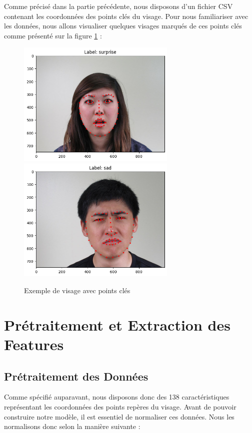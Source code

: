 \documentclass{rapport}
\begin{document}
Comme précisé dans la partie précédente, nous disposons d'un fichier CSV contenant les coordonnées des points clés du visage. Pour nous familiariser
avec les données, nous allons visualiser quelques visages marqués de ces points clés comme présenté sur la figure
\ref*{fig:face_landmarks} :
\begin{figure}
    \centering
    \includegraphics[height=6cm]{IMAGES/exemple1_landmark_jeu_donnee.png}
    \includegraphics[height=6cm]{IMAGES/exemple2_landmark_jeu_donnee.png}
    \caption{Exemple de visage avec points clés}
    \label{fig:face_landmarks}
\end{figure}

\section{Prétraitement et Extraction des Features}
\subsection{Prétraitement des Données}
Comme spécifié auparavant, nous disposons donc des 138 caractéristiques représentant les coordonnées des points repères du visage.
Avant de pouvoir construire notre modèle, il est essentiel de normaliser ces données.
Nous les normalisons donc selon la manière suivante \cite{kalapalaFacialExpressionRecognition2020} :\\
\end{document}
